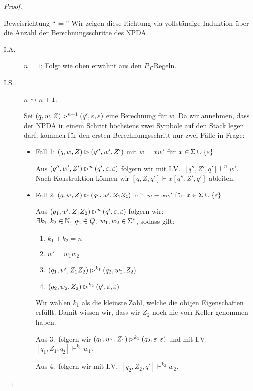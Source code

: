 \begin{proof}
\begin{itemize}
    \end{itemize}
    
    \item Beweisrichtung "`$\Leftarrow$"'
     Wir zeigen diese Richtung via vollständige Induktion über die Anzahl der Berechnungsschritte des \ac{NPDA}.
     \begin{description}
      \item[I.A.] $n=1$: Folgt wie oben erwähnt aus den $P_0$-Regeln.
      \item[I.S.] $n\rightsquigarrow n+1$:
      
      Sei $(q,w,Z) \rhd^{n+1} (q',\varepsilon,\varepsilon)$ eine Berechnung für $w$. Da wir annehmen, 
      dass der \ac{NPDA} in einem Schritt höchstens zwei Symbole auf den Stack legen darf, kommen für den ersten Berechnungsschritt nur zwei Fälle in Frage:
      \begin{itemize}
      \item Fall 1: $(q,w,Z)\rhd (q'', w',Z')$ mit $w=xw'$ für $x\in\Sigma\cup\{\varepsilon\}$
      
      Aus $(q'', w',Z')\rhd^n (q',\varepsilon,\varepsilon)$ folgern wir mit I.V.\
      $[q'', Z',q']\vdash^n w'$.
      Nach Konstruktion können wir $[q,Z,q']\vdash x [q'', Z',q']$ ableiten.

      
      \item Fall 2: $(q,w,Z)\rhd (q_1, w',Z_1Z_2)$ mit $w=xw'$ für $x\in\Sigma\cup\{\varepsilon\}$

            Aus $(q_1, w',Z_1Z_2)\rhd^n (q',\varepsilon,\varepsilon)$ folgern wir:
      $\exists k_1,k_2\in\mathbb{N}, \; q_2\in Q, \; w_1,w_2\in \Sigma^*$, sodass gilt:
      \begin{enumerate}
      \item $k_1+k_2=n$
      \item $w'=w_1w_2$
      \item $(q_1, w',Z_1Z_2)\rhd^{k_1} (q_2, w_2,Z_2)$
      \item $(q_2, w_2,Z_2)\rhd^{k_2} (q',\varepsilon,\varepsilon)$
      \end{enumerate}
      Wir wählen $k_1$ als die kleinste Zahl, welche die obigen Eigenschaften erfüllt.
      Damit wissen wir, dass wir $Z_2$ noch nie vom Keller genommen haben.
      
      Aus 3.\ folgern wir $(q_1, w_1,Z_1)\rhd^{k_1} (q_2, \varepsilon,\varepsilon)$ und mit I.V.\
      $[q_1, Z_1, q_2] \vdash^{k_1} w_1$.
      
      Aus 4.\ folgern wir mit I.V.\ $[q_2, Z_2, q'] \vdash^{k_2} w_2$.
      

\end{itemize}
\end{description}
\end{proof}
